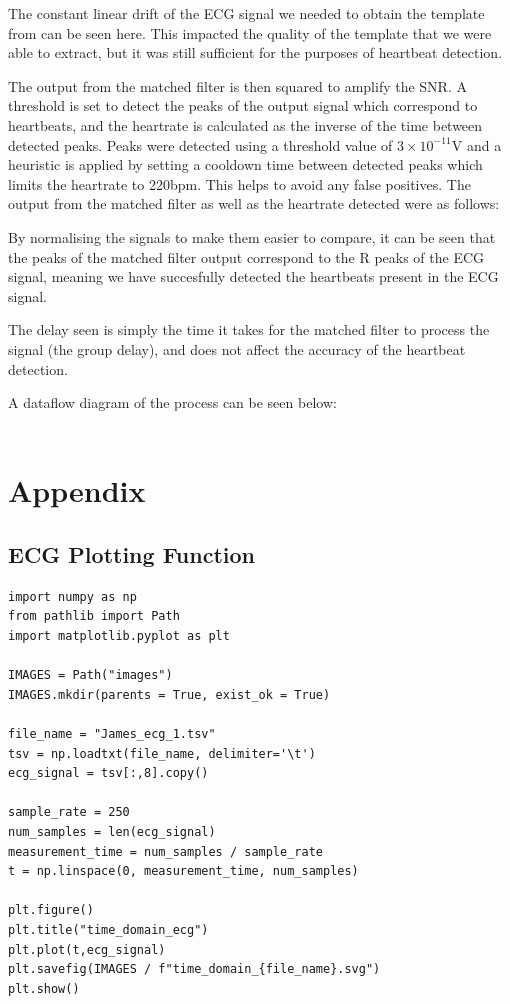 \documentclass[8pt]{extarticle}
\begin{document}
The constant linear drift of the ECG signal we needed to obtain the template from can be seen here. This impacted the quality of the template
that we were able to extract, but it was still sufficient for the purposes of heartbeat detection.

The output from the matched filter is then squared to
amplify the SNR\@. A threshold is set to detect the peaks of the output signal which correspond to heartbeats, and the heartrate is calculated 
as the inverse of the time between detected peaks. Peaks were detected using a threshold value of $3 \times 10^{-11}$V and a heuristic is applied by setting a cooldown time between detected peaks which limits
the heartrate to 220bpm. This helps to avoid any false positives. The output from the matched filter as well as the heartrate detected
were as follows:




By normalising the signals to make them easier to compare, it can be seen that the peaks of the matched filter output correspond to the R peaks of the ECG signal,
meaning we have succesfully detected the heartbeats present in the ECG signal.



The delay seen is simply the time it takes for the matched filter to process the signal (the group delay), and does not affect the accuracy of the heartbeat detection.

A dataflow diagram of the process can be seen below:\\
\\



\newpage
\onecolumn
\section{Appendix}
\subsection{ECG Plotting Function}
\begin{verbatim}
import numpy as np
from pathlib import Path
import matplotlib.pyplot as plt

IMAGES = Path("images")
IMAGES.mkdir(parents = True, exist_ok = True)

file_name = "James_ecg_1.tsv"
tsv = np.loadtxt(file_name, delimiter='\t')
ecg_signal = tsv[:,8].copy()

sample_rate = 250
num_samples = len(ecg_signal)
measurement_time = num_samples / sample_rate
t = np.linspace(0, measurement_time, num_samples)

plt.figure()
plt.title("time_domain_ecg")
plt.plot(t,ecg_signal)
plt.savefig(IMAGES / f"time_domain_{file_name}.svg")
plt.show()
\end{verbatim}
\end{document}
